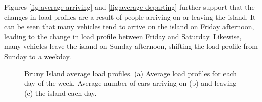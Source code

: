 Figures \ref{fig:average-arriving} and \ref{fig:average-departing} further support that the changes in load profiles are a result of people arriving on or leaving the island.
It can be seen that many vehicles tend to arrive on the island on Friday afternoon, leading to the change in load profile between Friday and Saturday.
Likewise, many vehicles leave the island on Sunday afternoon, shifting the load profile from Sunday to a weekday.


\begin{figure}[htbp]
	\centering
	\vfil
	\vfil
	\caption{Bruny Island average load profiles. (a) Average load profiles for each day of the week. Average number of cars arriving on (b) and leaving (c) the island each day.}
	\label{fig:average-load-profiles}
\end{figure}


